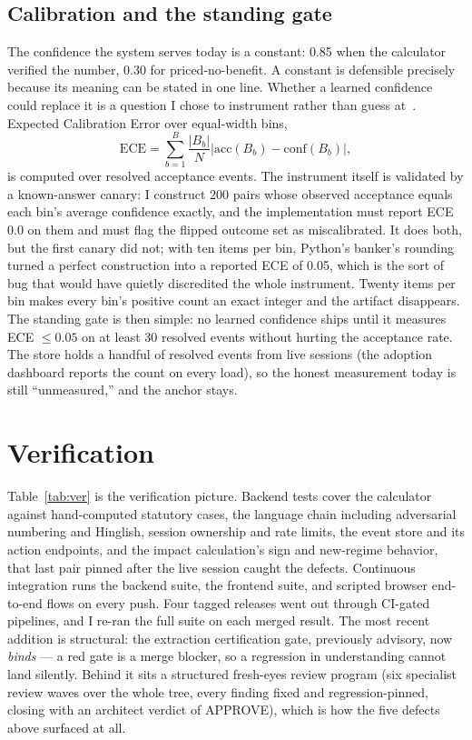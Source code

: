 \documentclass[conference]{IEEEtran}
\begin{document}
\subsection{Calibration and the standing gate}
The confidence the system serves today is a constant: 0.85 when the
calculator verified the number, 0.30 for priced-no-benefit. A constant
is defensible precisely because its meaning can be stated in one line.
Whether a learned confidence could replace it is a question I chose to
instrument rather than guess at~\cite{guo2017}. Expected Calibration Error over
equal-width bins,
\begin{equation}
\mathrm{ECE} = \sum_{b=1}^{B} \frac{|B_b|}{N}
\left| \mathrm{acc}(B_b) - \mathrm{conf}(B_b) \right|,
\label{eq:ece}
\end{equation}
is computed over resolved acceptance events. The instrument itself is
validated by a known-answer canary: I construct 200 pairs whose
observed acceptance equals each bin's average confidence exactly, and
the implementation must report ECE 0.0 on them and must flag the
flipped outcome set as miscalibrated. It does both, but the first
canary did not; with ten items per bin, Python's banker's rounding
turned a perfect construction into a reported ECE of 0.05, which is
the sort of bug that would have quietly discredited the whole
instrument. Twenty items per bin makes every bin's positive count an
exact integer and the artifact disappears. The standing gate is then
simple: no learned confidence ships until it measures ECE
$\leq 0.05$ on at least 30 resolved events without hurting the
acceptance rate. The store holds a handful of resolved events from
live sessions (the adoption dashboard reports the count on every
load), so the honest measurement today is still ``unmeasured,'' and
the anchor stays.

\section{Verification}
Table~\ref{tab:ver} is the verification picture. Backend tests cover
the calculator against hand-computed statutory cases, the language
chain including adversarial numbering and Hinglish, session ownership
and rate limits, the event store and its action endpoints, and the
impact calculation's sign and new-regime behavior, that last pair
pinned after the live session caught the defects. Continuous
integration runs the backend suite, the frontend suite, and scripted
browser end-to-end flows on every push. Four tagged releases went out
through CI-gated pipelines, and I re-ran the full suite on each merged
result. The most recent addition is structural: the extraction
certification gate, previously advisory, now \emph{binds} --- a red
gate is a merge blocker, so a regression in understanding cannot land
silently. Behind it sits a structured fresh-eyes review program (six
specialist review waves over the whole tree, every finding fixed and
regression-pinned, closing with an architect verdict of APPROVE), which
is how the five defects above surfaced at all.
\end{document}
